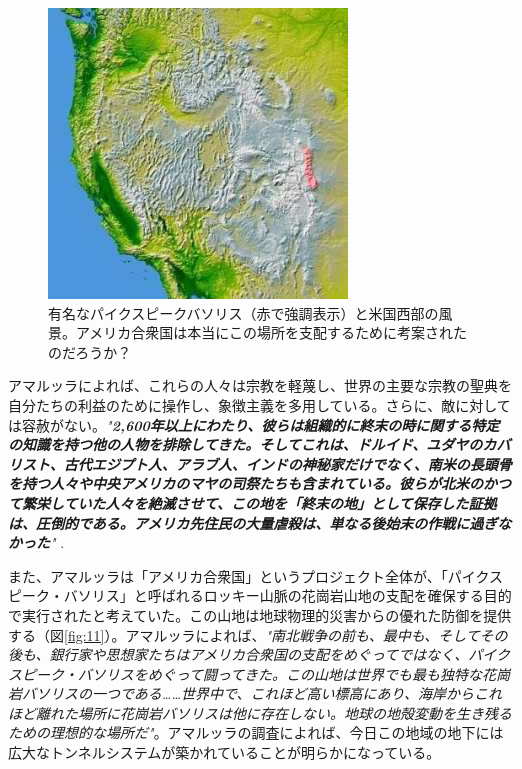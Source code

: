 \documentclass[10pt,twocolumn,letterpaper]{article}
\begin{document}
\begin{figure}[t]
\begin{center}
   \includegraphics[width=1\linewidth]{pike.jpg}
\end{center}
   \caption{有名なパイクスピークバソリス（赤で強調表示）と米国西部の風景\cite{36}。アメリカ合衆国は本当にこの場所を支配するために考案されたのだろうか？}
\label{fig:11}
\label{fig:onecol}
\end{figure}

アマルッラによれば、これらの人々は宗教を軽蔑し、世界の主要な宗教の聖典を自分たちの利益のために操作し、象徴主義を多用している。さらに、敵に対しては容赦がない。\textit{"\textbf{2,600年以上にわたり、彼らは組織的に終末の時に関する特定の知識を持つ他の人物を排除してきた。そしてこれは、ドルイド、ユダヤのカバリスト、古代エジプト人、アラブ人、インドの神秘家だけでなく、南米の長頭骨を持つ人々や中央アメリカのマヤの司祭たちも含まれている。彼らが北米のかつて繁栄していた人々を絶滅させて、この地を「終末の地」として保存した証拠は、圧倒的である。アメリカ先住民の大量虐殺は、単なる後始末の作戦に過ぎなかった}"} \cite{33,34}.

また、アマルッラは「アメリカ合衆国」というプロジェクト全体が、「パイクスピーク・バソリス」と呼ばれるロッキー山脈の花崗岩山地の支配を確保する目的で実行されたと考えていた。この山地は地球物理的災害からの優れた防御を提供する（図\ref{fig:11}）。アマルッラによれば、\textit{"南北戦争の前も、最中も、そしてその後も、銀行家や思想家たちはアメリカ合衆国の支配をめぐってではなく、パイクスピーク・バソリスをめぐって闘ってきた。この山地は世界でも最も独特な花崗岩バソリスの一つである……世界中で、これほど高い標高にあり、海岸からこれほど離れた場所に花崗岩バソリスは他に存在しない。地球の地殻変動を生き残るための理想的な場所だ"}\cite{33,34}。アマルッラの調査によれば、今日この地域の地下には広大なトンネルシステムが築かれていることが明らかになっている\cite{36}。
\end{document}

